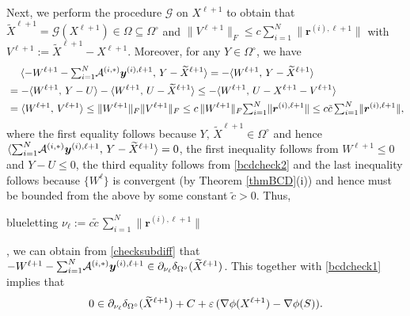 \documentclass[10pt]{article}
\newcommand{\blue}[1]{\begin{color}{blue}#1\end{color}}
\newcommand{\cA}{{\cal A}}
\begin{document}
Next, we perform the procedure $\mathcal{G}$ on $X^{\ell+1}$ to obtain that $\widetilde{X}^{\ell+1}=\mathcal{G}(X^{\ell+1})\in\Omega\subseteq\Omega^{\circ}$ and $\|V^{\ell+1}\|_F \leq c\sum^N_{i=1}\|\bm{r}^{(i),\ell+1}\|$ with $V^{\ell+1}:=\widetilde{X}^{\ell+1}-X^{\ell+1}$. Moreover, for any $Y\in\Omega^{\circ}$, we have
\begin{equation}\label{checksubdiff}
\begin{aligned}
&\quad \;\langle - W^{\ell+1} - {\textstyle\sum_{i=1}^N} \cA^{(i,*)}\bm{y}^{(i),\ell+1}, \,Y - \widetilde{X}^{\ell+1} \rangle = -\langle W^{\ell+1}, \,Y - \widetilde{X}^{\ell+1} \rangle \\
&= -\langle W^{\ell+1}, \,Y - U \rangle - \langle W^{\ell+1}, \,U - \widetilde{X}^{\ell+1} \rangle \leq - \langle W^{\ell+1}, \,U - X^{\ell+1} - V^{\ell+1} \rangle \\
&= \langle W^{\ell+1}, \,V^{\ell+1} \rangle \leq \|W^{\ell+1}\|_F\|V^{\ell+1}\|_F
\leq c\,\|W^{\ell+1}\|_F{\textstyle\sum^N_{i=1}}\|\bm{r}^{(i),\ell+1}\| \leq c\tilde{c}\,{\textstyle\sum^N_{i=1}}\|\bm{r}^{(i),\ell+1}\|,
\end{aligned}
\end{equation}
where the first equality follows because $Y,\,\widetilde{X}^{\ell+1}\in\Omega^{\circ}$ and hence $\langle{\textstyle\sum_{i=1}^N} \cA^{(i,*)}\bm{y}^{(i),\ell+1}, \,Y - \widetilde{X}^{\ell+1} \rangle=0$, the first inequality follows from $W^{\ell+1}\leq0$ and $Y-U\leq0$, the third equality follows from \eqref{bcdcheck2} and the last inequality follows because $\{W^{\ell}\}$ is convergent (by Theorem \ref{thmBCD}(i)) and hence must be bounded from the above by some constant $\tilde{c}>0$. Thus, \blue{letting $\nu_{\ell}:=c\tilde{c}\,{\textstyle\sum^N_{i=1}}\|\bm{r}^{(i),\ell+1}\|$}, we can obtain from \eqref{checksubdiff} that $- W^{\ell+1} - {\textstyle\sum_{i=1}^N} \cA^{(i,*)}\bm{y}^{(i),\ell+1}\in\blue{\partial_{\nu_{\ell}}}\delta_{\Omega^{\circ}}(\widetilde{X}^{\ell+1})$. This together with \eqref{bcdcheck1} implies that
\begin{equation*}
0 \in \blue{\partial_{\nu_{\ell}}}\delta_{\Omega^{\circ}}(\widetilde{X}^{\ell+1}) + C + \varepsilon\,(\nabla\phi(X^{\ell+1})-\nabla\phi(S)).
\end{equation*}
\end{document}

